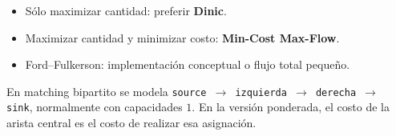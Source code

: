 \begin{itemize}
    \item S\'olo maximizar cantidad: preferir \textbf{Dinic}.
    \item Maximizar cantidad y minimizar costo: \textbf{Min-Cost Max-Flow}.
    \item Ford--Fulkerson: implementaci\'on conceptual o flujo total peque\~no.
\end{itemize}

En matching bipartito se modela
\texttt{source $\to$ izquierda $\to$ derecha $\to$ sink}, normalmente con
capacidades $1$. En la versi\'on ponderada, el costo de la arista central es el
costo de realizar esa asignaci\'on.
